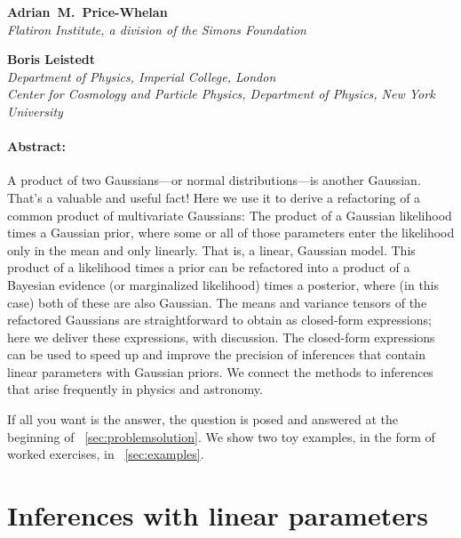 \medskip\noindent\textbf{Adrian~M.~Price-Whelan}\\
{\footnotesize%
  \textsl{Flatiron Institute, a division of the Simons Foundation}%
}

\medskip\noindent\textbf{Boris Leistedt}\\
{\footnotesize%
  \textsl{Department of Physics, Imperial College, London}\\
  \textsl{Center for Cosmology and Particle Physics, Department of Physics, New York University}%
}

\paragraph{Abstract:}
A product of two Gaussians---or normal distributions---is another Gaussian.
That's a valuable and useful fact!
Here we use it to derive a refactoring of a common product of
multivariate Gaussians:
The product of a Gaussian likelihood times a Gaussian prior, where some or all
of those parameters enter the likelihood only in the mean and only linearly.
That is, a linear, Gaussian model.
This product of a likelihood times a prior can be refactored into a product of a
Bayesian evidence (or marginalized likelihood) times a posterior, where
(in this case) both of these are also Gaussian.
The means and variance tensors of the refactored Gaussians are straightforward
to obtain as closed-form expressions;
here we deliver these expressions, with discussion.
The closed-form expressions can be used to speed up and improve the precision
of inferences that contain linear parameters with Gaussian priors.
We connect the methods to inferences that arise frequently in physics
and astronomy.

If all you want is the answer, the question is posed and answered at the
beginning of \sectionname~\ref{sec:problemsolution}.
We show two toy examples, in the form of worked exercises, in
\sectionname~\ref{sec:examples}.


\section{Inferences with linear parameters}

